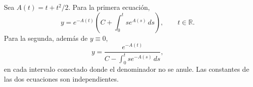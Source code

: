 Sea \(A(t)=t+t^2/2\). Para la primera ecuación,
\[
y=e^{-A(t)}\left(C+\int_0^t s e^{A(s)}\,ds\right),\qquad t\in\mathbb R.
\]
Para la segunda, además de \(y\equiv0\),
\[
y=\frac{e^{-A(t)}}{C-\int_0^t s e^{-A(s)}\,ds},
\]
en cada intervalo conectado donde el denominador no se anule. Las constantes de las dos ecuaciones son independientes.
